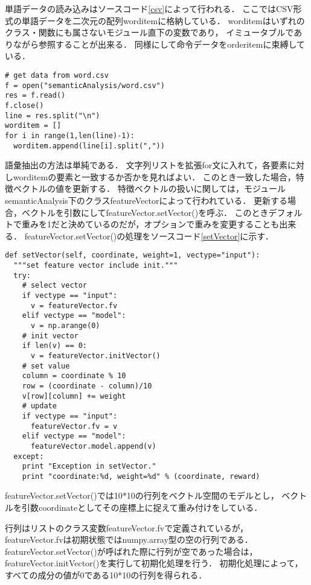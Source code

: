 \documentclass{jsarticle}
\begin{document}
\begin{multicols}{2}
単語データの読み込みはソースコード\ref{csv}によって行われる．
ここではCSV形式の単語データを二次元の配列worditemに格納している．
worditemはいずれのクラス・関数にも属さないモジュール直下の変数であり，
イミュータブルでありながら参照することが出来る．
同様にして命令データをorderitemに束縛している．

\begin{lstlisting}[caption=RaspiAudio/semanticAnalysis/semanticAnalysis.py,label=csv]
# get data from word.csv
f = open("semanticAnalysis/word.csv")
res = f.read()
f.close()
line = res.split("\n")
worditem = []
for i in range(1,len(line)-1):
  worditem.append(line[i].split(","))
\end{lstlisting}

語彙抽出の方法は単純である．
文字列リストを拡張for文に入れて，各要素に対しworditemの要素と一致するか否かを見ればよい．
このとき一致した場合，特徴ベクトルの値を更新する．
特徴ベクトルの扱いに関しては，モジュールsemanticAnalysis下のクラスfeatureVectorによって行われている．
更新する場合，ベクトルを引数にしてfeatureVector.setVector()を呼ぶ．
このときデフォルトで重みを1だと決めているのだが，オプションで重みを変更することも出来る．
featureVector.setVector()の処理をソースコード\ref{setVector}に示す．

\begin{lstlisting}[caption=RaspiAudio/semanticAnalysis/semanticAnalysis.py,label=setVector]
def setVector(self, coordinate, weight=1, vectype="input"):
  """set feature vector include init."""
  try:
    # select vector
    if vectype == "input":
      v = featureVector.fv
    elif vectype == "model":
      v = np.arange(0)
    # init vector
    if len(v) == 0:
      v = featureVector.initVector()
    # set value
    column = coordinate % 10
    row = (coordinate - column)/10
    v[row][column] += weight
    # update
    if vectype == "input":
      featureVector.fv = v
    elif vectype == "model":
      featureVector.model.append(v)
  except:
    print "Exception in setVector."
    print "coordinate:%d, weight=%d" % (coordinate, reward)
\end{lstlisting}

featureVector.setVector()では10*10の行列をベクトル空間のモデルとし，
ベクトルを引数coordinateとしてその座標上に捉えて重み付けをしている．

行列はリストのクラス変数featureVector.fvで定義されているが，
featureVector.fvは初期状態ではnumpy.array型の空の行列である．
featureVector.setVector()が呼ばれた際に行列が空であった場合は，
featureVector.initVector()を実行して初期化処理を行う．
初期化処理によって，すべての成分の値が0である10*10の行列を得られる．


\end{multicols}
\end{document}

